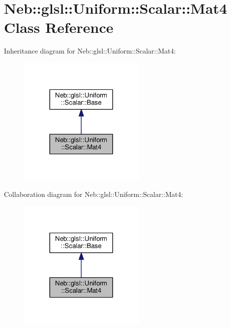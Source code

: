\hypertarget{classNeb_1_1glsl_1_1Uniform_1_1Scalar_1_1Mat4}{\section{Neb\-:\-:glsl\-:\-:Uniform\-:\-:Scalar\-:\-:Mat4 Class Reference}
\label{classNeb_1_1glsl_1_1Uniform_1_1Scalar_1_1Mat4}
}


Inheritance diagram for Neb\-:\-:glsl\-:\-:Uniform\-:\-:Scalar\-:\-:Mat4\-:
\nopagebreak
\begin{figure}[H]
\begin{center}
\leavevmode
\includegraphics[width=176pt]{classNeb_1_1glsl_1_1Uniform_1_1Scalar_1_1Mat4__inherit__graph}
\end{center}
\end{figure}


Collaboration diagram for Neb\-:\-:glsl\-:\-:Uniform\-:\-:Scalar\-:\-:Mat4\-:
\nopagebreak
\begin{figure}[H]
\begin{center}
\leavevmode
\includegraphics[width=176pt]{classNeb_1_1glsl_1_1Uniform_1_1Scalar_1_1Mat4__coll__graph}
\end{center}
\end{figure}

